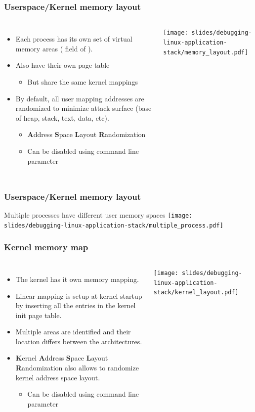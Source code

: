 \begin{frame}
  \frametitle{Userspace/Kernel memory layout}
  \begin{columns}
    \begin{itemize}
      \item Each process has its own set of virtual memory areas (
            field of ).
      \item Also have their own page table
      \begin{itemize}
        \item But share the same kernel mappings
      \end{itemize}
      \item By default, all user mapping addresses are randomized to
            minimize attack surface (base of heap, stack, text, data, etc).
      \begin{itemize}
        \item {\bf A}ddress {\bf S}pace {\bf L}ayout {\bf R}andomization
        \item Can be disabled using  command line parameter
      \end{itemize}
    \end{itemize}
    \texttt{[image: slides/debugging-linux-application-stack/memory\_layout.pdf]}
  \end{columns}
\end{frame}

\begin{frame}
  \frametitle{Userspace/Kernel memory layout}
  Multiple processes have different user memory spaces
  \center\texttt{[image: slides/debugging-linux-application-stack/multiple\_process.pdf]}
\end{frame}

\begin{frame}[fragile]
  \frametitle{Kernel memory map}
  \begin{columns}
    \begin{itemize}
      \item The kernel has it own memory mapping.
      \item Linear mapping is setup at kernel startup by inserting all the
            entries in the kernel init page table.
      \item Multiple areas are identified and their location differs between the
            architectures.
      \item {\bf K}ernel {\bf A}ddress {\bf S}pace {\bf L}ayout
            {\bf R}andomization also allows to randomize kernel address space
            layout.
      \begin{itemize}
        \item Can be disabled using  command line parameter
      \end{itemize}
    \end{itemize}
    \texttt{[image: slides/debugging-linux-application-stack/kernel\_layout.pdf]}
  \end{columns}
\end{frame}

